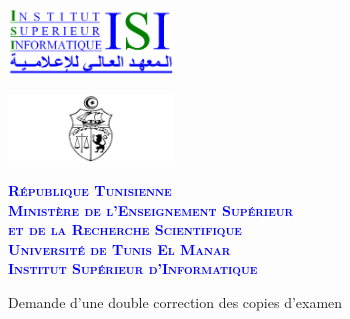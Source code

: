 \documentclass{article}
\begin{document}
\pagestyle{fancy}
\renewcommand{\footrulewidth}{0.4pt}
\renewcommand{\headrulewidth}{0.0pt}
\renewcommand{\baselinestretch}{1}
\lhead{}
\rhead{}

\noindent\begin{Form}
\begin{center}
\begin{minipage}[c]{58mm}
\begin{center}
\includegraphics[width=44mm]{LogoISI}
\end{center}
\end{minipage}
\begin{minipage}[c]{58mm}
\begin{center}
\includegraphics[width=44mm]{Tn2}
\end{center}
\end{minipage}
\begin{minipage}[c]{58mm}
\begin{center}
\textcolor{blue}{
	\footnotesize{
			\textbf{ 
			\textsc{République Tunisienne\\
			Ministère de l'Enseignement Supérieur\\
			et de la Recherche Scientifique\\
			Université de Tunis El Manar\\
			Institut Supérieur d'Informatique\\
			}
		}
	}
}
\end{center}
\end{minipage}
\end{center}

\vspace*{7mm}

\begin{center}
 \huge{Demande d'une double correction des copies d'examen}
 \end{center}


\end{Form}
\end{document}
